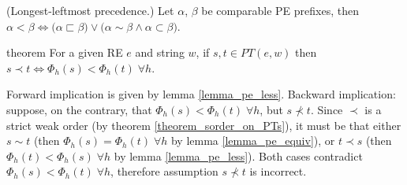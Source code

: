 \documentclass[AMA,STIX1COL]{WileyNJD-v2}
\begin{document}
    \begin{definition}\label{pe_order}
    (Longest-leftmost precedence.)
    Let $\alpha$, $\beta$ be comparable PE prefixes, then
    $\alpha < \beta \Leftrightarrow
        \big( \alpha \sqsubset \beta \big) \vee
        \big( \alpha \sim \beta \wedge \alpha \subset \beta \big)$.
    \end{definition}

\begin{theoremEnd}[restate, no link to proof, no link to theorem, category=theorem_order_on_pe_same_as_on_pt]{theorem}
    \label{theorem_order_on_pe_same_as_on_pt}
    For a given RE $e$ and string $w$,
    if $s, t \in PT(e, w)$ then
    $s \prec t \Leftrightarrow \Phi_{h}(s) < \Phi_{h}(t) \; \forall h$.
\end{theoremEnd}
\begin{proofEnd}
    Forward implication is given by lemma \ref{lemma_pe_less}.
    Backward implication:
    suppose, on the contrary, that $\Phi_{h}(s) < \Phi_{h}(t) \; \forall h$, but $s \not\prec t$.
    Since $\prec$ is a strict weak order (by theorem \ref{theorem_sorder_on_PTs}),
    it must be that either $s \sim t$
    (then $\Phi_{h}(s) = \Phi_{h}(t) \; \forall h$ by lemma \ref{lemma_pe_equiv}),
    or $t \prec s$
    (then $\Phi_{h}(t) < \Phi_{h}(s) \; \forall h$ by lemma \ref{lemma_pe_less}).
    Both cases contradict $\Phi_{h}(s) < \Phi_{h}(t) \; \forall h$,
    therefore assumption $s \not\prec t$ is incorrect.
\end{proofEnd}
\end{document}
